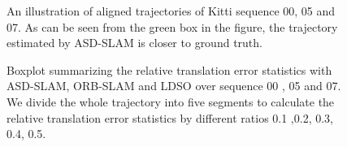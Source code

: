 \documentclass[letterpaper, 10 pt, conference]{ieeeconf}  %
\begin{document}
\begin{figure}[htbp]
\flushleft 
{}%
%

%
%

\caption{An illustration of  aligned trajectories of Kitti sequence 00, 05 and 07. As can be seen from the green box in the figure, the trajectory estimated by ASD-SLAM is closer to ground truth.} 
\end{figure}


\begin{figure}[htbp]
\flushleft 
{}%
%

%
%

\caption{Boxplot summarizing the relative translation error statistics with ASD-SLAM, ORB-SLAM and LDSO over sequence 00 , 05 and 07. We divide the whole trajectory into five segments to  calculate the relative translation error statistics by different ratios 0.1 ,0.2, 0.3, 0.4, 0.5. } 
\end{figure}
\end{document}
